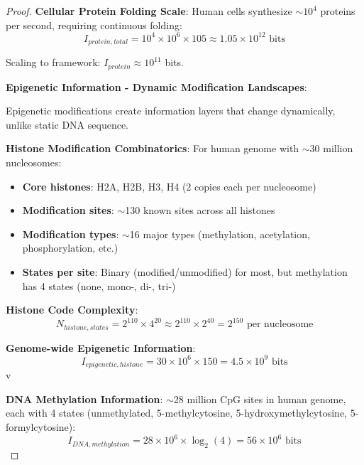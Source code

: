 \documentclass[12pt,a4paper]{article}
\begin{document}
\begin{proof}
\textbf{Cellular Protein Folding Scale}: Human cells synthesize $\sim10^4$ proteins per second, requiring continuous folding:
\begin{equation}
I_{protein,total} = 10^4 \times 10^6 \times 105 \approx 1.05 \times 10^{12} \text{ bits}
\end{equation}

Scaling to framework: $I_{protein} \approx 10^{11}$ bits.

\textbf{Epigenetic Information - Dynamic Modification Landscapes}:

Epigenetic modifications create information layers that change dynamically, unlike static DNA sequence.

\textbf{Histone Modification Combinatorics}: For human genome with $\sim$30 million nucleosomes:
\begin{itemize}
\item \textbf{Core histones}: H2A, H2B, H3, H4 (2 copies each per nucleosome)
\item \textbf{Modification sites}: $\sim$130 known sites across all histones
\item \textbf{Modification types}: $\sim$16 major types (methylation, acetylation, phosphorylation, etc.)
\item \textbf{States per site}: Binary (modified/unmodified) for most, but methylation has 4 states (none, mono-, di-, tri-)
\end{itemize}

\textbf{Histone Code Complexity}:
\begin{equation}
N_{histone,states} = 2^{110} \times 4^{20} \approx 2^{110} \times 2^{40} = 2^{150} \text{ per nucleosome}
\end{equation}

\textbf{Genome-wide Epigenetic Information}:
\begin{equation}
I_{epigenetic,histone} = 30 \times 10^6 \times 150 = 4.5 \times 10^9 \text{ bits}
\end{equation}v

\textbf{DNA Methylation Information}: $\sim$28 million CpG sites in human genome, each with 4 states (unmethylated, 5-methylcytosine, 5-hydroxymethylcytosine, 5-formylcytosine):
\begin{equation}
I_{DNA,methylation} = 28 \times 10^6 \times \log_2(4) = 56 \times 10^6 \text{ bits}
\end{equation}\newline


\end{proof}
\end{document}
